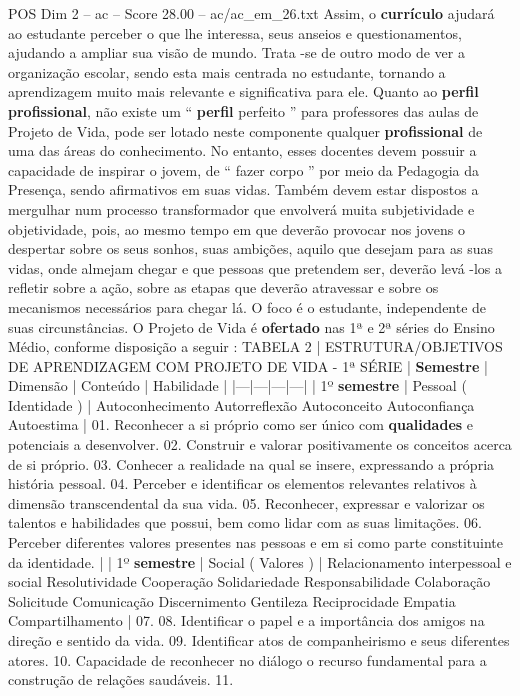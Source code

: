 \begin{textsample}{POS Dim 2 – ac – Score 28.00 – ac/ac\_em\_26.txt}
Assim, o \textbf{currículo} ajudará ao estudante perceber o que lhe interessa, seus anseios e questionamentos, ajudando a ampliar sua visão de mundo.
Trata -se de outro modo de ver a organização escolar, sendo esta mais centrada no estudante, tornando a aprendizagem muito mais relevante e significativa para ele.
Quanto ao \textbf{perfil} \textbf{profissional}, não existe um “ \textbf{perfil} perfeito ” para professores das aulas de Projeto de Vida, pode ser lotado neste componente qualquer \textbf{profissional} de uma das áreas do conhecimento.
No entanto, esses docentes devem possuir a capacidade de inspirar o jovem, de “ fazer corpo ” por meio da Pedagogia da Presença, sendo afirmativos em suas vidas.
Também devem estar dispostos a mergulhar num processo transformador que envolverá muita subjetividade e objetividade, pois, ao mesmo tempo em que deverão provocar nos jovens o despertar sobre os seus sonhos, suas ambições, aquilo que desejam para as suas vidas, onde almejam chegar e que pessoas que pretendem ser, deverão levá -los a refletir sobre a ação, sobre as etapas que deverão atravessar e sobre os mecanismos necessários para chegar lá.
O foco é o estudante, independente de suas circunstâncias.
O Projeto de Vida é \textbf{ofertado} nas 1ª e 2ª séries do Ensino Médio, conforme disposição a seguir : TABELA 2 | ESTRUTURA/OBJETIVOS DE APRENDIZAGEM COM PROJETO DE VIDA - 1ª SÉRIE | \textbf{Semestre} | Dimensão | Conteúdo | Habilidade | |---|---|---|---| | 1º \textbf{semestre} | Pessoal ( Identidade ) | Autoconhecimento Autorreflexão Autoconceito Autoconfiança Autoestima | 01.
Reconhecer a si próprio como ser único com \textbf{qualidades} e potenciais a desenvolver. 02.
Construir e valorar positivamente os conceitos acerca de si próprio. 03.
Conhecer a realidade na qual se insere, expressando a própria história pessoal. 04.
Perceber e identificar os elementos relevantes relativos à dimensão transcendental da sua vida. 05.
Reconhecer, expressar e valorizar os talentos e habilidades que possui, bem como lidar com as suas limitações. 06.
Perceber diferentes valores presentes nas pessoas e em si como parte constituinte da identidade. | | 1º \textbf{semestre} | Social ( Valores ) | Relacionamento interpessoal e social Resolutividade Cooperação Solidariedade Responsabilidade Colaboração Solicitude Comunicação Discernimento Gentileza Reciprocidade Empatia Compartilhamento | 07. 08.
Identificar o papel e a importância dos amigos na direção e sentido da vida. 09.
Identificar atos de companheirismo e seus diferentes atores. 10.
Capacidade de reconhecer no diálogo o recurso fundamental para a construção de relações saudáveis. 11.

\end{textsample}
